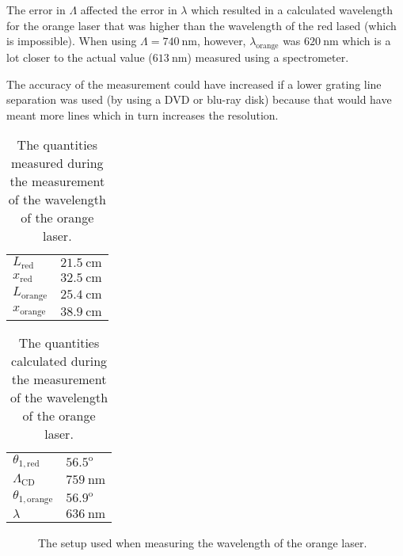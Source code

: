 \documentclass[12pt,a4paper]{article}
\begin{document}
The error in $\Lambda$ affected the error in $\lambda$ which resulted in a calculated wavelength for the orange laser that was higher than the wavelength of the red lased (which is impossible). When using $\Lambda=\SI{740}{\nano\metre}$, however, $\lambda_\text{orange}$ was $\SI{620}{\nano\metre}$ which is a lot closer to the actual value ($\SI{613}{\nano\metre}$) measured using a spectrometer.

The accuracy of the measurement could have increased if a lower grating line separation was used (by using a DVD or blu-ray disk) because that would have meant more lines which in turn increases the resolution.
\begin{table}
  \centering
  \begin{tabular}{|l|l|}\hline
    $L_\text{red}$ & $\SI{21.5}{\centi\metre}$ \\
    $x_\text{red}$ & $\SI{32.5}{\centi\metre}$ \\
    $L_\text{orange}$ & $\SI{25.4}{\centi\metre}$ \\
    $x_\text{orange}$ & $\SI{38.9}{\centi\metre}$ \\ \hline
  \end{tabular}
  \caption{The quantities measured during the measurement of the wavelength of the orange laser.}
  \label{tab:diffraction_orange_vals}
\end{table}
\begin{table}
  \centering
  \begin{tabular}{|l|l|}\hline
    $\theta_{1,\text{red}}$ & $56.5^\text{o}$ \\
    $\Lambda_\text{CD}$ & $\SI{759}{\nano\metre}$ \\
    $\theta_{1,\text{orange}}$ & $56.9^\text{o}$ \\
    $\lambda$ & $\SI{636}{\nano\metre}$ \\ \hline
  \end{tabular}
  \caption{The quantities calculated during the measurement of the wavelength of the orange laser.}
  \label{tab:diffraction_orange_calcs}
\end{table}
\begin{figure}[h]
  \centering
  \noindent\makebox[\textwidth]{\scalebox{0.90}{}}
  \caption{The setup used when measuring the wavelength of the orange laser.}
  \label{fig:diffraction_orange}
\end{figure}
\end{document}
